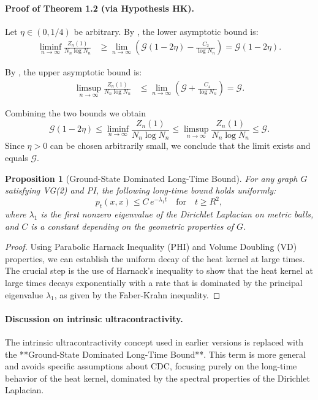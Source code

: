 \documentclass[11pt]{article}
\numberwithin{equation}{section}
\newtheorem{proposition}[theorem]{Proposition}
\newcommand{\cG}{\mathcal{G}}
\begin{document}
\paragraph{Proof of Theorem 1.2 (via Hypothesis HK).}
Let $\eta \in (0,1/4)$ be arbitrary. By , the lower asymptotic bound is:
\begin{align*}
\liminf_{n \to \infty} \frac{Z_n(1)}{N_n \log N_n} &\geq \lim_{n \to \infty} \left( \cG(1-2\eta) - \frac{C_2}{\log N_n} \right) = \cG(1-2\eta).
\end{align*}

By , the upper asymptotic bound is:
\begin{align*}
\limsup_{n \to \infty} \frac{Z_n(1)}{N_n \log N_n} &\leq \lim_{n \to \infty} \left( \cG + \frac{C_4}{\log N_n} \right) = \cG.
\end{align*}

Combining the two bounds we obtain
\[
\cG(1-2\eta) \leq \liminf_{n \to \infty} \frac{Z_n(1)}{N_n \log N_n} \leq \limsup_{n \to \infty} \frac{Z_n(1)}{N_n \log N_n} \leq \cG.
\]
Since $\eta > 0$ can be chosen arbitrarily small, we conclude that the limit exists and equals $\cG$.

\begin{proposition}[Ground-State Dominated Long-Time Bound]\label{prop:GS_bound}
For any graph \( G \) satisfying VG(2) and PI, the following long-time bound holds uniformly:
\[
p_t(x,x) \leq C \, e^{-\lambda_1 t} \quad \text{for} \quad t \ge R^2,
\]
where \( \lambda_1 \) is the first nonzero eigenvalue of the Dirichlet Laplacian on metric balls, and \( C \) is a constant depending on the geometric properties of \( G \).
\end{proposition}

\begin{proof}
Using Parabolic Harnack Inequality (PHI) and Volume Doubling (VD) properties, we can establish the uniform decay of the heat kernel at large times. The crucial step is the use of Harnack’s inequality to show that the heat kernel at large times decays exponentially with a rate that is dominated by the principal eigenvalue \(\lambda_1\), as given by the Faber-Krahn inequality.
\end{proof}
 
\paragraph{Discussion on intrinsic ultracontractivity.}
The intrinsic ultracontractivity concept used in earlier versions is replaced with the **Ground-State Dominated Long-Time Bound**. This term is more general and avoids specific assumptions about CDC, focusing purely on the long-time behavior of the heat kernel, dominated by the spectral properties of the Dirichlet Laplacian.
\end{document}
